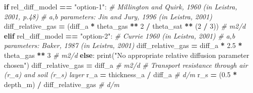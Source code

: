 \documentclass[]{article}
\newenvironment{Shaded}{\begin{snugshade}}{\end{snugshade}}
\newcommand{\DecValTok}[1]{\textcolor[rgb]{0.00,0.00,0.81}{{#1}}}
\newcommand{\FloatTok}[1]{\textcolor[rgb]{0.00,0.00,0.81}{{#1}}}
\newcommand{\StringTok}[1]{\textcolor[rgb]{0.31,0.60,0.02}{{#1}}}
\newcommand{\CommentTok}[1]{\textcolor[rgb]{0.56,0.35,0.01}{\textit{{#1}}}}
\newcommand{\ControlFlowTok}[1]{\textcolor[rgb]{0.13,0.29,0.53}{\textbf{{#1}}}}
\newcommand{\OperatorTok}[1]{\textcolor[rgb]{0.81,0.36,0.00}{\textbf{{#1}}}}
\newcommand{\BuiltInTok}[1]{{#1}}
\newcommand{\NormalTok}[1]{{#1}}
\begin{document}
\begin{Shaded}
\begin{Highlighting}[]
    \ControlFlowTok{if} \NormalTok{rel_diff_model }\OperatorTok{==} \StringTok{"option-1"}\NormalTok{:}
        \CommentTok{# Millington and Quirk, 1960 (in Leistra, 2001, p.48)}
        \CommentTok{# a,b parameters: Jin and Jury, 1996 (in Leistra, 2001)}
        \NormalTok{diff_relative_gas }\OperatorTok{=} \NormalTok{(diff_a }\OperatorTok{*} \NormalTok{theta_gas }\OperatorTok{**} \DecValTok{2} \OperatorTok{/}
                             \NormalTok{theta_sat }\OperatorTok{**} \NormalTok{(}\DecValTok{2} \OperatorTok{/} \DecValTok{3}\NormalTok{))  }\CommentTok{# m2/d}
    \ControlFlowTok{elif} \NormalTok{rel_diff_model }\OperatorTok{==} \StringTok{"option-2"}\NormalTok{:}
        \CommentTok{# Currie 1960 (in Leistra, 2001)}
        \CommentTok{# a,b parameters: Baker, 1987 (in Leistra, 2001)}
        \NormalTok{diff_relative_gas }\OperatorTok{=} \NormalTok{diff_a }\OperatorTok{*} \FloatTok{2.5} \OperatorTok{*} \NormalTok{theta_gas }\OperatorTok{**} \DecValTok{3}  \CommentTok{# m2/d}
    \ControlFlowTok{else}\NormalTok{:}
        \BuiltInTok{print}\NormalTok{(}\StringTok{"No appropriate relative diffusion parameter chosen"}\NormalTok{)}
        \NormalTok{diff_relative_gas }\OperatorTok{=} \NormalTok{diff_a  }\CommentTok{# m2/d}
    \CommentTok{# Transport resistance through air (r_a) and soil (r_s) layer}
    \NormalTok{r_a }\OperatorTok{=} \NormalTok{thickness_a }\OperatorTok{/} \NormalTok{diff_a  }\CommentTok{# d/m}
    \NormalTok{r_s }\OperatorTok{=} \NormalTok{(}\FloatTok{0.5} \OperatorTok{*} \NormalTok{depth_m) }\OperatorTok{/} \NormalTok{diff_relative_gas  }\CommentTok{# d/m}


\end{Highlighting}
\end{Shaded}
\end{document}
